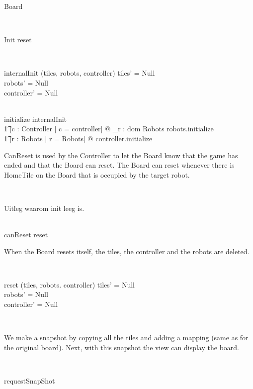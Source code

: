 \documentclass[12pt]{article}
\begin{document}
\begin{class}{Board}
\begin{classcom}
\end{classcom} \\
\begin{schema}{Init}
reset
\end{schema} \\
\begin{schema}{internalInit}
\Delta (tiles, robots, controller)
\where
tiles' \not = Null \\
robots' \not = Null \\
controller' \not = Null
\end{schema} \\
initialize \sdef internalInit \; \comp \\ \t1
[c : Controller | c = controller] @ \bigwedge_{r : dom Robots} robots.initialize \; \comp \\ \t1
[r : \power Robots | r = \dom Robots] @ controller.initialize \\
\znewpage
\begin{classcom}
CanReset is used by the Controller to let the Board know that the game has ended and that the Board can reset. The Board can reset whenever there is HomeTile on the Board that is occupied by the target robot.
\end{classcom} \\
\begin{classcom}
Uitleg waarom init leeg is.
\end{classcom} \\
canReset \sdef [\exists t : \ran tiles | t \in HomeTileTiles @ \\
\t1 t.target = t.occupier] \wedge reset \\
\begin{classcom}
When the Board resets itself, the tiles, the controller and the robots are deleted.
\end{classcom} \\
\begin{schema}{reset}
\Delta (tiles, robots. controller)
\where
tiles' = Null \\
robots' = Null \\
controller' = Null
\end{schema} \\
\begin{classcom}
We make a snapshot by copying all the tiles and adding a mapping (same as for the original board). Next, with this snapshot the view can display the board.
\end{classcom} \\
\begin{schema}{requestSnapShot}

\end{schema}
\end{class}
\end{document}
